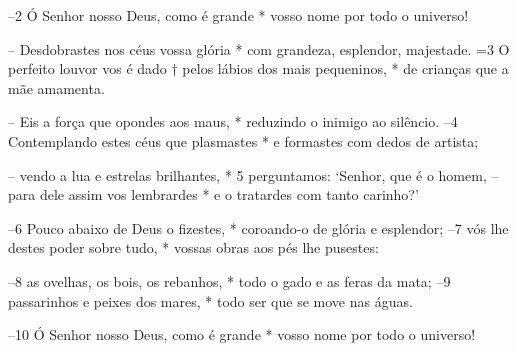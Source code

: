 –2 Ó Senhor nosso Deus, como é grande * 
vosso nome por todo o universo! 

– Desdobrastes nos céus vossa glória * 
com grandeza, esplendor, majestade. 
=3 O perfeito louvor vos é dado † 
pelos lábios dos mais pequeninos, * 
de crianças que a mãe amamenta. 

– Eis a força que opondes aos maus, * 
reduzindo o inimigo ao silêncio. 
–4 Contemplando estes céus que plasmastes * 
e formastes com dedos de artista; 

– vendo a lua e estrelas brilhantes, * 
5 perguntamos: ‘Senhor, que é o homem,
– para dele assim vos lembrardes * 
e o tratardes com tanto carinho?’ 

–6 Pouco abaixo de Deus o fizestes, *
coroando-o de glória e esplendor; 
–7 vós lhe destes poder sobre tudo, *
vossas obras aos pés lhe pusestes: 

–8 as ovelhas, os bois, os rebanhos, *
todo o gado e as feras da mata; 
–9 passarinhos e peixes dos mares, *
todo ser que se move nas águas. 

–10 Ó Senhor nosso Deus, como é grande * 
vosso nome por todo o universo!